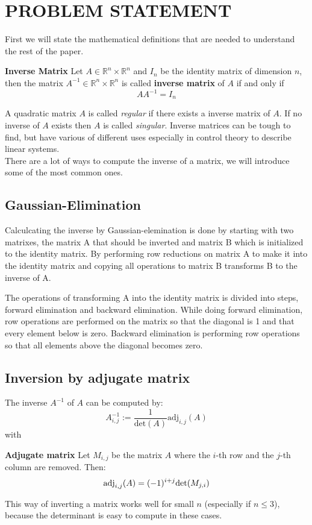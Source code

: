 

\section{PROBLEM STATEMENT}\label{sec:problem}
First we will state the mathematical definitions that are needed to understand the rest of the paper.
\begin{definition}
	\textbf{Inverse Matrix}
	Let $A \in \mathbb{R}^n \times \mathbb{R}^n$ and $I_n$ be the identity matrix of dimension $n$, then the matrix $A^{-1} \in \mathbb{R}^n \times \mathbb{R}^n$ is called \textbf{inverse matrix} of $A$ if and only if
	\begin{equation}\label{eq:inverse}
	AA^{-1} = I_n
	\end{equation}
\end{definition}
A quadratic matrix $A$ is called \emph{regular} if there exists a inverse matrix of $A$. If no inverse of $A$ exists then $A$ is called \emph{singular}. Inverse matrices can be tough to find, but have various of different uses especially in control theory to describe linear systems.  
\vspace{0.2cm}\\
There are a lot of ways to compute the inverse of a matrix, we will introduce some of the most common ones.\\
\subsection*{Gaussian-Elimination}
Calculcating the inverse by Gaussian-elemination is done by starting with two matrixes, the matrix A that should be inverted and matrix B which is initialized to the identity matrix. By performing row reductions on matrix A to make it into the identity matrix and copying all operations to matrix B transforms B to the inverse of A.

The operations of transforming A into the identity matrix is divided into steps, forward elimination and backward elimination.
While doing forward elimination, row operations are performed on the matrix so that the diagonal is 1 and that every element below is zero.
Backward elimination is performing row operations so that all elements above the diagonal becomes zero.

\subsection*{Inversion by adjugate matrix}
The inverse $A^{-1}$ of $A$ can be computed by:
\begin{equation}
	A^{-1}_{i,j} := \frac{1}{\text{det}(A)} \text{adj}_{i,j}(A)
\end{equation}
with
\begin{definition}
	\textbf{Adjugate matrix} Let $M_{i,j}$ be the matrix $A$ where the $i$-th row and the $j$-th column are removed. Then:
	\[ \text{\textnormal{adj}}_{i,j}(A) = (-1)^{i+j} \text{\textnormal{det}}(M_{j,i}) \]
\end{definition}
This way of inverting a matrix works well for small $n$ (especially if $n \leq 3$), because the determinant is easy to compute in these cases.\\
